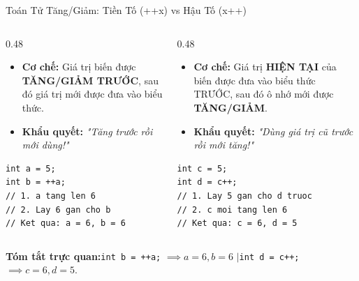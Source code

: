 \documentclass[aspectratio=169, 10pt]{beamer}
\begin{document}
\begin{frame}[fragile]{Toán Tử Tăng/Giảm: Tiền Tố (++x) vs Hậu Tố (x++)}
  \begin{columns}[T]
    \begin{column}{0.48\textwidth}
      \begin{tcolorbox}[colback=UniLightBlue!30,colframe=UniBlue,title=\textbf{Toán tử Tiền tố (Prefix: ++x, --x)},fonttitle=\small\bfseries]
        \begin{itemize}\small
          \item \textbf{Cơ chế:} Giá trị biến được \textbf{TĂNG/GIẢM TRƯỚC}, sau đó giá trị mới được đưa vào biểu thức.
          \item \textbf{Khẩu quyết:} \textit{"Tăng trước rồi mới dùng!"}
        \end{itemize}
\begin{lstlisting}[numbers=none]
int a = 5;
int b = ++a; 
// 1. a tang len 6
// 2. Lay 6 gan cho b
// Ket qua: a = 6, b = 6
\end{lstlisting}
      \end{tcolorbox}
    \end{column}

    \begin{column}{0.48\textwidth}
      \begin{tcolorbox}[colback=CSharpPurple!10,colframe=CSharpPurple,title=\textbf{Toán tử Hậu tố (Postfix: x++, x--)},fonttitle=\small\bfseries]
        \begin{itemize}\small
          \item \textbf{Cơ chế:} Giá trị \textbf{HIỆN TẠI} của biến được đưa vào biểu thức TRƯỚC, sau đó ô nhớ mới được \textbf{TĂNG/GIẢM}.
          \item \textbf{Khẩu quyết:} \textit{"Dùng giá trị cũ trước rồi mới tăng!"}
        \end{itemize}
\begin{lstlisting}[numbers=none]
int c = 5;
int d = c++; 
// 1. Lay 5 gan cho d truoc
// 2. c moi tang len 6
// Ket qua: c = 6, d = 5
\end{lstlisting}
      \end{tcolorbox}
    \end{column}
  \end{columns}

  \begin{center}
    \small \textbf{Tóm tắt trực quan:}\quad \texttt{int b = ++a;} $\implies a=6, b=6$ \quad$\Big|$\quad \texttt{int d = c++;} $\implies c=6, d=5$.
  \end{center}
\end{frame}
\end{document}
